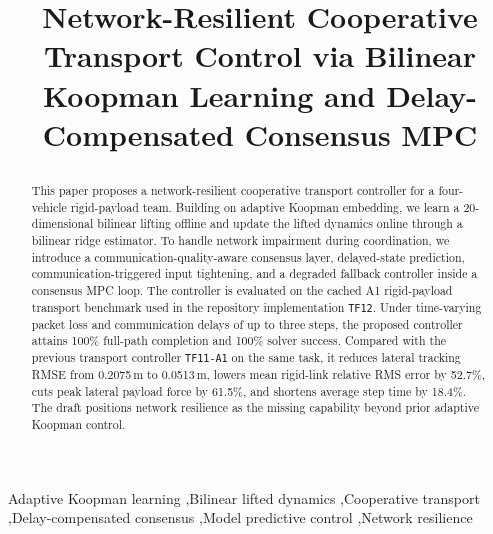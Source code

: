 \documentclass[twocolumn,3p,times,procedia]{elsarticle}
\begin{document}
\small
\begin{frontmatter}

\dochead{}
\title{
\begin{flushleft}
{\LARGE Network-Resilient Cooperative Transport Control via Bilinear Koopman Learning and Delay-Compensated Consensus MPC}
\end{flushleft}
}

\author[]{}

\address{
}


\begin{abstract}
This paper proposes a network-resilient cooperative transport controller for a four-vehicle rigid-payload team. Building on adaptive Koopman embedding, we learn a 20-dimensional bilinear lifting offline and update the lifted dynamics online through a bilinear ridge estimator. To handle network impairment during coordination, we introduce a communication-quality-aware consensus layer, delayed-state prediction, communication-triggered input tightening, and a degraded fallback controller inside a consensus MPC loop. The controller is evaluated on the cached A1 rigid-payload transport benchmark used in the repository implementation \texttt{TF12}. Under time-varying packet loss and communication delays of up to three steps, the proposed controller attains 100\% full-path completion and 100\% solver success. Compared with the previous transport controller \texttt{TF11-A1} on the same task, it reduces lateral tracking RMSE from 0.2075\,m to 0.0513\,m, lowers mean rigid-link relative RMS error by 52.7\%, cuts peak lateral payload force by 61.5\%, and shortens average step time by 18.4\%. The draft positions network resilience as the missing capability beyond prior adaptive Koopman control.
\end{abstract}

\begin{keyword}
Adaptive Koopman learning \sep Bilinear lifted dynamics \sep Cooperative transport \sep Delay-compensated consensus \sep Model predictive control \sep Network resilience
\end{keyword}

\end{frontmatter}
\end{document}
